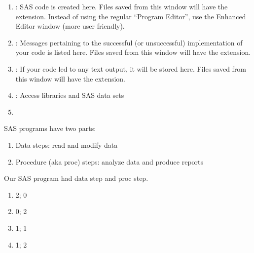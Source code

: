 \begin{frame}
\begin{enumerate}
\item {}: SAS code is created here. Files saved from this window will have the  extension. Instead of using the regular ``Program Editor'', use the Enhanced Editor window (more user friendly).
\item {}: Messages pertaining to the successful (or unsuccessful) implementation of your code is listed here. Files saved from this window will have the  extension.
\item  {}: If your code led to any text output, it will be stored here. Files saved from this window will have the  extension.
\item {}: Access libraries and SAS data sets
\item[]
\end{enumerate}
\end{frame}

\begin{frame}
SAS programs have two parts:
\begin{enumerate}
    \item Data steps: read and modify data
    \item Procedure (aka proc) steps: analyze data and produce reports
\end{enumerate}
\vskip10pt
\begin{clicker}{Our SAS program had \underline{\hspace{0.5in}} data step and \underline{\hspace{0.5in}} proc step.}
\begin{enumerate}
    \item 2; 0
    \item 0; 2
    \item 1; 1
    \item 1; 2
\end{enumerate}
\end{clicker}
\end{frame}


